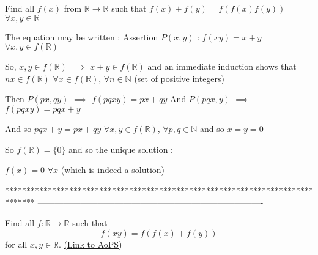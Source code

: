 \begin{solution}
	\begin{tcolorbox}Find all $ f(x)$ from $ \mathbb R\to\mathbb R$ such that $ f(x)+f(y)=f(f(x)f(y))$ $ \forall x,y\in\mathbb R$\end{tcolorbox}

The equation may be written : Assertion $ P(x,y)$ : $ f(xy)=x+y$ $ \forall x,y\in f(\mathbb R)$

So, $ x,y\in f(\mathbb R)$ $ \implies$ $ x+y\in f(\mathbb R)$ and an immediate induction shows that $ nx\in f(\mathbb R)$ $ \forall x\in f(\mathbb R)$, $ \forall n\in\mathbb N$ (set of positive integers)

Then $ P(px,qy)$ $ \implies$ $ f(pqxy)=px+qy$
And $ P(pqx,y)$ $ \implies$ $ f(pqxy)=pqx+y$

And so $ pqx+y=px+qy$ $ \forall x,y\in f(\mathbb R)$, $ \forall p,q\in\mathbb N$ and so $ x=y=0$

So $ f(\mathbb R)=\{0\}$ and so the unique solution :

$ f(x)=0$ $ \forall x$ (which is indeed a solution)
\end{solution}
*******************************************************************************
-------------------------------------------------------------------------------

\begin{problem}
	Find all $ f: \mathbb R\to\mathbb R$ such that \[ f(xy) = f(f(x)+f(y))\] for all $x,y\in\mathbb R$.
	\flushright \href{https://artofproblemsolving.com/community/c6h316343}{(Link to AoPS)}
\end{problem}



